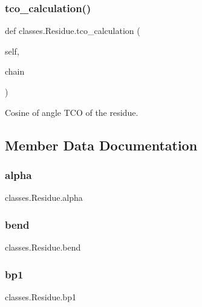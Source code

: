 \subsubsection{\texorpdfstring{tco\+\_\+calculation()}{tco\_calculation()}}
{\footnotesize\ttfamily def classes.\+Residue.\+tco\+\_\+calculation (\begin{DoxyParamCaption}\item[{}]{self,  }\item[{}]{chain }\end{DoxyParamCaption})}

\begin{DoxyVerb}Cosine of angle TCO of the residue.\end{DoxyVerb}
 

\subsection{Member Data Documentation}
\mbox{\label{classclasses_1_1Residue_ae371572e3671ec59bd5e84fd0f38c35c}} 
\subsubsection{\texorpdfstring{alpha}{alpha}}
{\footnotesize\ttfamily classes.\+Residue.\+alpha}

\mbox{\label{classclasses_1_1Residue_a59375cd6b4b684c3ab3166b62de251a6}} 
\subsubsection{\texorpdfstring{bend}{bend}}
{\footnotesize\ttfamily classes.\+Residue.\+bend}

\mbox{\label{classclasses_1_1Residue_af9198b85f24a8c9100cca8cb8e115b7c}} 
\subsubsection{\texorpdfstring{bp1}{bp1}}
{\footnotesize\ttfamily classes.\+Residue.\+bp1}

